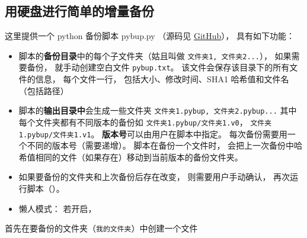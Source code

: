 \subsection{用硬盘进行简单的增量备份}
这里提供一个 python 备份脚本 pybup.py （源码见 \href{https://github.com/MacroUniverse/pybup}{GitHub}）， 具有如下功能：
\begin{itemize}
\item 脚本的\textbf{备份目录}中的每个子文件夹（姑且叫做 \verb|文件夹1, 文件夹2...|）， 如果需要备份， 就手动创建空白文件 \verb|pybup.txt|。 该文件会保存该目录下的所有文件的信息， 每个文件一行， 包括大小、修改时间、SHA1 哈希值和文件名（包括路径）
\item 脚本的\textbf{输出目录中}会生成一些文件夹 \verb|文件夹1.pybup, 文件夹2.pybup...| 其中每个文件夹都有不同版本的备份如 \verb|文件夹1.pybup/文件夹1.v0|， \verb|文件夹1.pybup/文件夹1.v1|。 \textbf{版本号}可以由用户在脚本中指定。 每次备份需要用一个不同的版本号（需要递增）。 脚本在备份一个文件时， 会把上一次备份中哈希值相同的文件（如果存在）移动到当前版本的备份文件夹。
\item 如果要备份的文件夹和上次备份后存在改变， 则需要用户手动确认， 再次运行脚本（）。
\item 懒人模式： 若开启， 
\end{itemize}

首先在要备份的文件夹（\verb|我的文件夹|）中创建一个文件 

